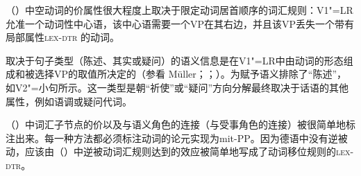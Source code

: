 \begin{exe}
\begin{xlist}[iv.]
\begin{exe}
\begin{xlist}[iv.]
{{{{{{{                                                  }\\
                                                 }\\
                                      }\\
                          }\\
}\\
}}
\z
%
（）中空动词的价属性很大程度上取决于限定动词居首顺序的词汇规则：V1"=LR允准一个动词性中心语，该中心语需要一个VP在其右边，并且该VP丢失一个带有局部属性\textsc{lex-dtr} 的动词。

取决于句子类型（陈述、其实或疑问）的语义信息是在V1"=LR中由动词的形态组成和被选择VP的\slashv 取值所决定的（参看 Müller\citeyear[\S~10.3]{MuellerLehrbuch1}；\citeyear{MuellerSatztypen}；\citeyear{MuellerGS}）。为赋予语义排除了“陈述”，如V2"=小句所示。这一类型是朝“祈使”或“疑问”方向分解最终取决于话语的其他属性，例如语调或疑问代词。

（）中词汇子节点的价以及与语义角色的连接（与受事角色的连接）被很简单地标注出来。每一种方法都必须标注动词的论元实现为mit-PP。因为德语中没有逆被动，应该由（）中逆被动词汇规则达到的效应被简单地写成了动词移位规则的\textsc{lex-dtr}。


\end{xlist}
\end{exe}
\end{xlist}
\end{exe}
